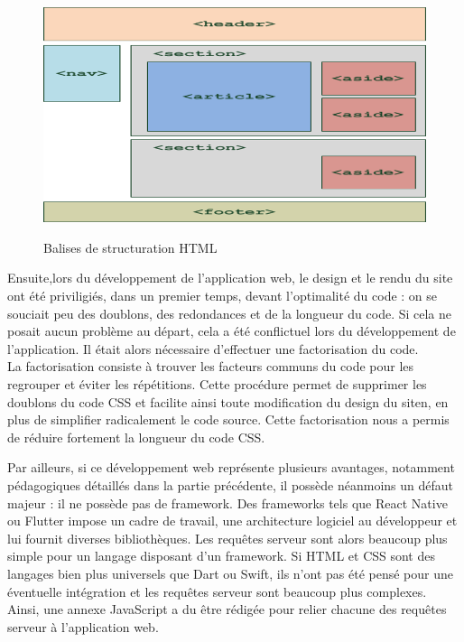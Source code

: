 \documentclass[oneside,a4paper,13pt]{article}
\begin{document}
\begin{figure}[H]
    \centering
    \includegraphics[scale=0.4]{Images/balise.png}
    \label{fig:neural_network}
    \caption{Balises de structuration HTML}
\end{figure}

Ensuite,lors du développement de l'application web, le design et le rendu du site ont été priviligiés, dans un premier temps, devant l'optimalité du code : on se souciait peu des doublons, des redondances et de la longueur du code. Si cela ne posait aucun problème au départ, cela a été conflictuel lors du développement de l'application. Il était alors nécessaire d'effectuer une factorisation du code. \\
La factorisation consiste à trouver les facteurs communs du code pour les regrouper et éviter les répétitions. Cette procédure permet de supprimer les doublons du code CSS et facilite ainsi toute modification du design du siten, en plus de simplifier radicalement le code source. Cette factorisation nous a permis de réduire fortement la longueur du code CSS. 

\medbreak 
Par ailleurs, si ce développement web représente plusieurs avantages, notamment pédagogiques détaillés dans la partie précédente, il possède néanmoins un défaut majeur : il ne possède pas de framework. Des frameworks tels que React Native ou Flutter impose un cadre de travail, une architecture logiciel au développeur et lui fournit diverses bibliothèques. Les requêtes serveur sont alors beaucoup plus simple pour un langage disposant d'un framework. 
Si HTML et CSS sont des langages bien plus universels que Dart ou Swift, ils n'ont pas été pensé pour une éventuelle intégration et les requêtes serveur sont beaucoup plus complexes. Ainsi, une annexe JavaScript a du être rédigée pour relier chacune des requêtes serveur à l'application web.
\end{document}
